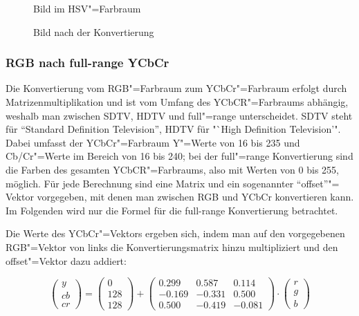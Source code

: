 \documentclass[a4paper,12pt,abstracton,titlepage]{scrartcl}
\begin{document}
\begin{figure}[htbp]
\begin{minipage}[t]{0.48\textwidth}
  \begin{center}
    \caption{Bild im HSV"=Farbraum}
    \label{hsvVorher}
  \end{center}
\end{minipage}
\begin{minipage}[t]{0.52\textwidth}
  \begin{center}
    \caption{Bild nach der Konvertierung}
    \label{hsv2rgb}
  \end{center}
\end{minipage}
\end{figure}


\subsubsection{RGB nach full-range YCbCr}
Die Konvertierung vom RGB"=Farbraum zum YCbCr"=Farbraum erfolgt durch Matrizenmultiplikation und ist vom Umfang des YCbCR"=Farbraums abhängig, weshalb man zwischen SDTV, HDTV und full"=range unterscheidet. SDTV steht für "`Standard Definition Television"', HDTV für "`High Definition Television'". Dabei umfasst der YCbCr"=Farbraum Y"=Werte von 16 bis 235 und Cb/Cr"=Werte im Bereich von 16 bis 240; bei der full"=range Konvertierung sind die Farben des gesamten YCbCR"=Farbraums, also mit Werten von 0 bis 255, möglich. Für jede Berechnung sind eine Matrix und ein sogenannter "`offset"'"= Vektor vorgegeben, mit denen man zwischen RGB und YCbCr konvertieren kann. Im Folgenden wird nur die Formel für die full-range Konvertierung betrachtet. 

Die Werte des YCbCr"=Vektors ergeben sich, indem man auf den vorgegebenen RGB"=Vektor von links die Konvertierungsmatrix hinzu multipliziert und den offset"=Vektor dazu addiert: 

\[
    \left(\begin{array}{c} y \\ cb \\ cr \end{array}\right) =
    \left(\begin{array}{c} 0 \\ 128 \\ 128 \end{array}\right)
    +
    \begin{pmatrix} 0.299 & 0.587 & 0.114 \\ -0.169 & -0.331 & 0.500 \\ 0.500 & -0.419 & -0.081
    \end{pmatrix} \cdot \left(\begin{array}{c} r \\ g \\ b \end{array}\right)
\]
  
\end{document}

